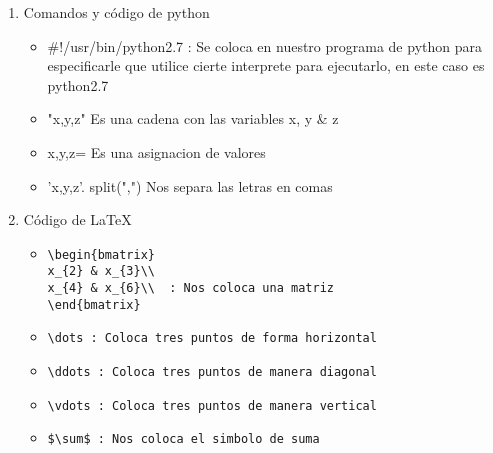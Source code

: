 \documentclass{book}
\begin{document}
\begin{enumerate}
\begin{itemize}
		
	\end{itemize}%
	\newpage
	\item Comandos y código de python
	\begin{itemize}
		\item \#!/usr/bin/python2.7  : Se coloca en nuestro programa de python para especificarle que utilice cierte interprete para ejecutarlo, en este caso es python2.7
		\item "x,y,z" Es una cadena con las variables x, y \& z
		\item x,y,z= Es una asignacion de valores
		\item 'x,y,z'. split(",") Nos separa las letras en comas
	\end{itemize}
	\item Código de \LaTeX
	\begin{itemize}
		\item 
		\begin{lstlisting}
\begin{bmatrix}
x_{2} & x_{3}\\
x_{4} & x_{6}\\  : Nos coloca una matriz
\end{bmatrix}
		\end{lstlisting}
		\item 
		\begin{lstlisting}
\dots : Coloca tres puntos de forma horizontal
		\end{lstlisting}
		\item 
		\begin{lstlisting}
\ddots : Coloca tres puntos de manera diagonal
		\end{lstlisting}
		\item 
		\begin{lstlisting}
\vdots : Coloca tres puntos de manera vertical
		\end{lstlisting}
		
		
		\item 
		\begin{lstlisting}
$\sum$ : Nos coloca el simbolo de suma
		\end{lstlisting}
		
		
	\end{itemize}	
	
	
	
	
\end{enumerate}%




\end{document}
